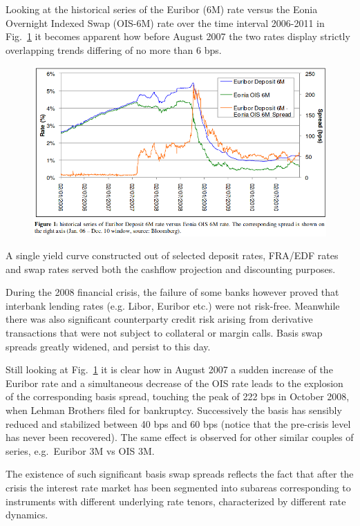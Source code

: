 Looking at the historical series of the Euribor (6M) rate versus the Eonia 
Overnight Indexed Swap (OIS-6M) rate over the time interval 2006-2011 in Fig.~\ref{fig:libor_vs_eonia} it becomes
apparent how before August 2007 the two rates display strictly overlapping trends differing of no more than 6 bps.

\begin{figure}[h]
	\centering
	\includegraphics[width=0.7\linewidth]{figures/credit_crunch.png}
	\label{fig:libor_vs_eonia}
\end{figure}

A single yield curve constructed out of selected deposit rates, FRA/EDF rates 
and swap rates served both the cashflow projection and discounting purposes.

During the 2008 financial crisis, the failure of some banks however proved that interbank lending rates (e.g. Libor, Euribor etc.) were not risk-free. Meanwhile
there was also significant counterparty credit risk arising from derivative
transactions that were not subject to collateral or margin calls. 
Basis swap spreads greatly widened, and persist to this day. 

Still looking at Fig.~\ref{fig:libor_vs_eonia} it is clear how in August 2007
a sudden increase of the Euribor rate and a simultaneous decrease of the OIS rate
leads to the explosion of the corresponding basis spread, touching the peak of 222
bps in October 2008, when Lehman Brothers filed for bankruptcy. Successively the
basis has sensibly reduced and stabilized between 40 bps and 60 bps (notice that the pre-crisis level has never been recovered). 
The same effect is observed for other similar couples of series, e.g.~Euribor 3M 
vs OIS 3M.

The existence of such significant basis swap spreads reflects the fact that after
the crisis the interest rate market has been segmented into subareas corresponding
to instruments with different underlying rate tenors, characterized by different 
rate dynamics. 

